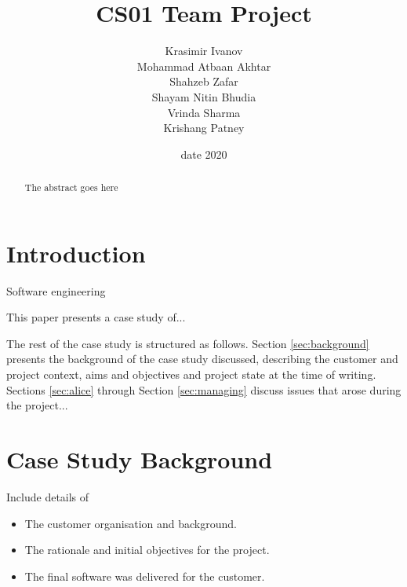 \documentclass{l3proj}
\begin{document}
\title{CS01 Team Project}

    \author{Krasimir Ivanov\\
        Mohammad Atbaan Akhtar \\
        Shahzeb Zafar \\
        Shayam Nitin Bhudia \\
        Vrinda Sharma\\ 
        Krishang Patney\\}

\date{date 2020}

\maketitle

\begin{abstract}

The abstract goes here

\end{abstract}

\educationalconsent

\newpage

\section{Introduction}

Software engineering 

This paper presents a case study of... 


The rest of the case study is structured as follows.  Section
\ref{sec:background} presents the background of the case study
discussed, describing the customer and project context, aims and
objectives and project state at the time of writing.  Sections
\ref{sec:alice} through Section \ref{sec:managing} discuss issues that
arose during the project...

\section{Case Study Background}

Include details of 

\begin{itemize}
\item The customer organisation and background.
\item The rationale and initial objectives for the project.
\item The final software was delivered for the customer.
\end{itemize}
\end{document}
